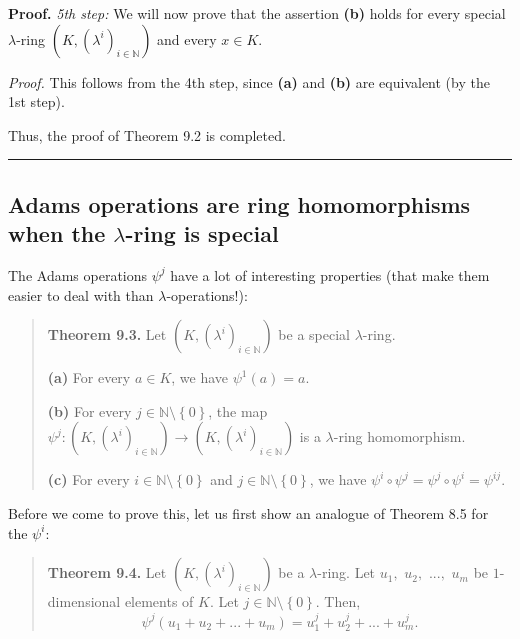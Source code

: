 \documentclass[numbers=enddot,12pt,final,onecolumn,notitlepage]{scrartcl}%
\newenvironment{proof}[1][Proof]{\noindent\textbf{#1.} }{\ \rule{0.5em}{0.5em}}
\begin{document}
\begin{proof}
\textit{5th step:} We will now prove that the assertion \textbf{(b)} holds for
every special $\lambda$-ring $\left(  K,\left(  \lambda^{i}\right)
_{i\in\mathbb{N}}\right)  $ and every $x\in K$.

\textit{Proof.} This follows from the 4th step, since \textbf{(a)} and
\textbf{(b)} are equivalent (by the 1st step).

Thus, the proof of Theorem 9.2 is completed.
\end{proof}

\subsection{Adams operations are ring homomorphisms when the $\lambda$-ring is
special}

The Adams operations $\psi^{j}$ have a lot of interesting properties (that
make them easier to deal with than $\lambda$-operations!):

\begin{quote}
\textbf{Theorem 9.3.} Let $\left(  K,\left(  \lambda^{i}\right)
_{i\in\mathbb{N}}\right)  $ be a special $\lambda$-ring.

\textbf{(a)} For every $a\in K$, we have $\psi^{1}\left(  a\right)  =a$.

\textbf{(b)} For every $j\in\mathbb{N}\setminus\left\{  0\right\}  $, the map
$\psi^{j}:\left(  K,\left(  \lambda^{i}\right)  _{i\in\mathbb{N}}\right)
\rightarrow\left(  K,\left(  \lambda^{i}\right)  _{i\in\mathbb{N}}\right)  $
is a $\lambda$-ring homomorphism.

\textbf{(c)} For every $i\in\mathbb{N}\setminus\left\{  0\right\}  $ and
$j\in\mathbb{N}\setminus\left\{  0\right\}  $, we have $\psi^{i}\circ\psi
^{j}=\psi^{j}\circ\psi^{i}=\psi^{ij}$.
\end{quote}

Before we come to prove this, let us first show an analogue of Theorem 8.5 for
the $\psi^{i}$:

\begin{quote}
\textbf{Theorem 9.4.} Let $\left(  K,\left(  \lambda^{i}\right)
_{i\in\mathbb{N}}\right)  $ be a $\lambda$-ring. Let $u_{1},$ $u_{2},$ $...,$
$u_{m}$ be $1$-dimensional elements of $K$. Let $j\in\mathbb{N}\setminus
\left\{  0\right\}  $. Then,%
\[
\psi^{j}\left(  u_{1}+u_{2}+...+u_{m}\right)  =u_{1}^{j}+u_{2}^{j}%
+...+u_{m}^{j}.
\]

\end{quote}
\end{document}
